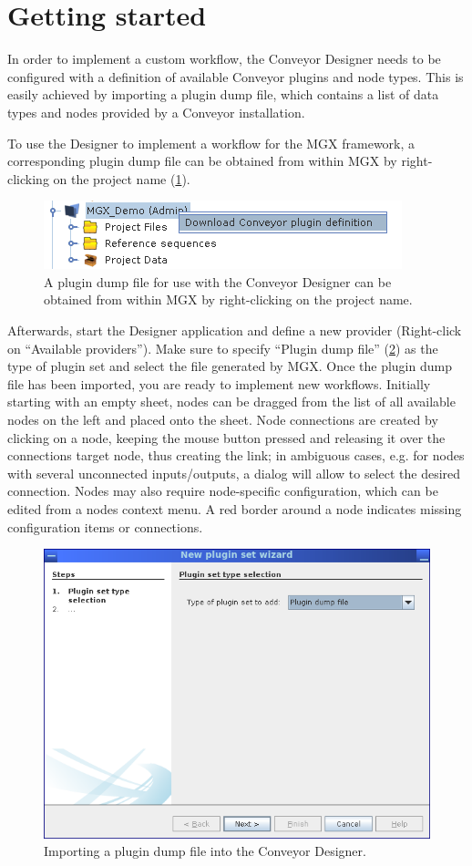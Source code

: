 \section{Getting started}

In order to implement a custom workflow, the Conveyor Designer needs to be configured
with a definition of available Conveyor plugins and node types. This is easily 
achieved by importing a plugin dump file, which contains a list of data types and
nodes provided by a Conveyor installation.

To use the Designer to implement a workflow for the MGX framework, a corresponding
plugin dump file can be obtained from within MGX by right-clicking on the 
project name (\ref{getdump}).

\begin{figure}[H]
\centering
\includegraphics[width=.5\textwidth]{img/conveyor/getdump}
\caption[Obtaining a plugin dump file.]{A plugin dump file for use with the Conveyor Designer can be obtained from within MGX
by right-clicking on the project name.}
\label{getdump}
\end{figure}

Afterwards, start the Designer application and define a new provider (Right-click on ``Available providers''). 
Make sure to specify ``Plugin dump file'' (\ref{loaddump}) as the type of plugin set and select the file
generated by MGX. Once the plugin
dump file has been imported, you are ready to implement new workflows. Initially starting with an empty sheet,
nodes can be dragged from the list of all available nodes on the left and placed onto the sheet. Node connections
are created by clicking on a node, keeping the mouse button pressed and releasing it over the connections target
node, thus creating the link; in ambiguous cases, e.g. for nodes with several unconnected
inputs/outputs, a dialog will allow to select the desired connection.
Nodes may also require node-specific configuration, which can be edited from a nodes context menu.
A red border around a node indicates missing configuration items or connections.

\begin{figure}[H]
\centering
\includegraphics[width=.7\textwidth]{img/conveyor/loaddump}
\caption[Adding a new provider.]{Importing a plugin dump file into the Conveyor Designer.}
\label{loaddump}
\end{figure}

